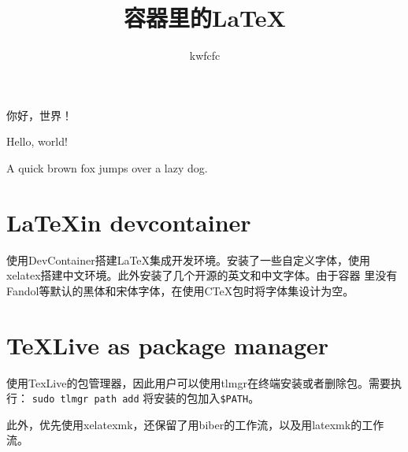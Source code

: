 \documentclass[UTF8]{article}
\author{kwfcfc}
\date{}
\title{容器里的\LaTeX }
\begin{document}
\maketitle

你好，世界！

Hello, world!

A quick brown fox jumps over a lazy dog.

\section{\LaTeX in devcontainer}

使用DevContainer搭建\LaTeX 集成开发环境。安装了一些自定义字体，使用xelatex搭建中文环境。此外安装了几个开源的英文和中文字体。由于容器
里没有Fandol等默认的黑体和宋体字体，在使用CTeX包时将字体集设计为空。

\section{TeXLive as package manager}

使用TexLive的包管理器，因此用户可以使用tlmgr在终端安装或者删除包。需要执行：
\texttt{sudo tlmgr path add}
将安装的包加入\texttt{\$PATH}。

此外，优先使用xelatexmk，还保留了用biber的工作流，以及用latexmk的工作流。
\end{document}
